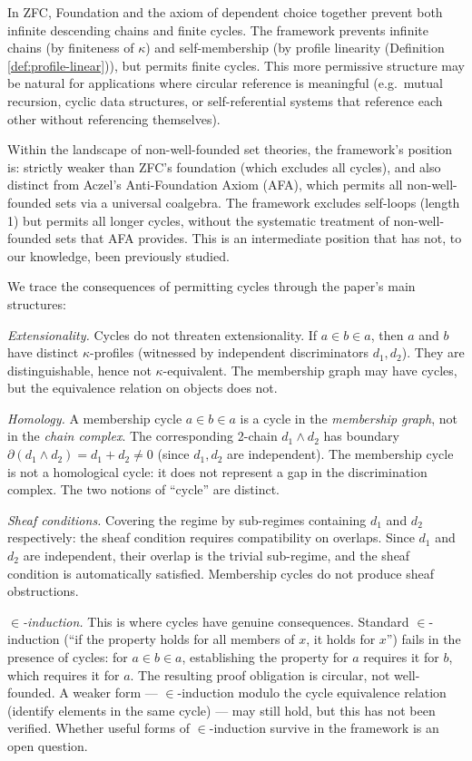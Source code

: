 \begin{remark}
In ZFC, Foundation and the axiom of dependent choice
together prevent both infinite descending chains and
finite cycles. The framework prevents infinite chains
(by finiteness of $\kappa$) and self-membership (by
profile linearity (Definition \ref{def:profile-linear})), but permits finite cycles. This more
permissive structure may be natural for applications
where circular reference is meaningful (e.g.\ mutual
recursion, cyclic data structures, or self-referential
systems that reference each other without referencing
themselves).

Within the landscape of non-well-founded set theories,
the framework's position is: strictly weaker than ZFC's
foundation (which excludes all cycles), and also distinct
from Aczel's Anti-Foundation Axiom (AFA), which permits
all non-well-founded sets via a universal coalgebra.
The framework excludes self-loops (length 1) but permits
all longer cycles, without the systematic treatment of
non-well-founded sets that AFA provides. This is an
intermediate position that has not, to our knowledge,
been previously studied.

We trace the consequences of permitting cycles through
the paper's main structures:

\emph{Extensionality.} Cycles do not threaten
extensionality. If $a \in b \in a$, then $a$ and $b$
have distinct $\kappa$-profiles (witnessed by independent
discriminators $d_1, d_2$). They are distinguishable,
hence not $\kappa$-equivalent. The membership graph may
have cycles, but the equivalence relation on objects
does not.

\emph{Homology.} A membership cycle $a \in b \in a$
is a cycle in the \emph{membership graph}, not in the
\emph{chain complex}. The corresponding 2-chain
$d_1 \wedge d_2$ has boundary
$\partial(d_1 \wedge d_2) = d_1 + d_2 \neq 0$
(since $d_1, d_2$ are independent). The membership
cycle is not a homological cycle: it does not
represent a gap in the discrimination complex.
The two notions of ``cycle'' are distinct.

\emph{Sheaf conditions.} Covering the regime by
sub-regimes containing $d_1$ and $d_2$ respectively:
the sheaf condition requires compatibility on overlaps.
Since $d_1$ and $d_2$ are independent, their overlap
is the trivial sub-regime, and the sheaf condition is
automatically satisfied. Membership cycles do not
produce sheaf obstructions.

\emph{$\in$-induction.} This is where cycles have
genuine consequences. Standard $\in$-induction
(``if the property holds for all members of $x$, it
holds for $x$'') fails in the presence of cycles: for
$a \in b \in a$, establishing the property for $a$
requires it for $b$, which requires it for $a$. The
resulting proof obligation is circular, not
well-founded. A weaker form --- $\in$-induction modulo
the cycle equivalence relation (identify elements in
the same cycle) --- may still hold, but this has not
been verified. Whether useful forms of $\in$-induction
survive in the framework is an open question.
\end{remark}

